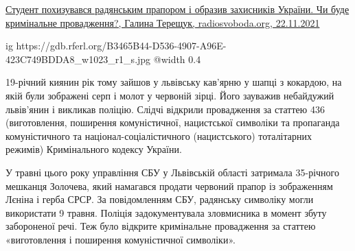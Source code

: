  
 
 
 
 

\href{https://www.radiosvoboda.org/a/komunizm-totalitarnyy-rezhym-symvoilka/31573870.html}{%
Студент похизувався радянським прапором і образив захисників України. Чи буде кримінальне провадження?, %
Галина Терещук, radiosvoboda.org, 22.11.2021%
}

\begin{multicols}{2}
\ifcmt
  ig https://gdb.rferl.org/B3465B44-D536-4907-A96E-423C749BDDA8_w1023_r1_s.jpg
  @width 0.4
\fi



19-річний киянин рік тому зайшов у львівську кав’ярню у шапці з кокардою, на
якій були зображені серп і молот у червоній зірці. Його зауважив небайдужий
львів’янин і викликав поліцію. Слідчі відкрили провадження за статтею 436
(виготовлення, поширення комуністичної, нацистської символіки та пропаганда
комуністичного та націонал-соціалістичного (нацистського) тоталітарних режимів)
Кримінального кодексу України.

У травні цього року управління СБУ у Львівській області затримала 35-річного
мешканця Золочева, який намагався продати червоний прапор із зображенням Лєніна
і герба СРСР. За повідомленням СБУ, радянську символіку могли використати 9
травня. Поліція задокументувала зловмисника в момент збуту забороненої речі.
Теж було відкрите кримінальне провадження за статтею «виготовлення і поширення
комуністичної символіки».


\end{multicols}
